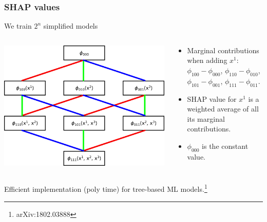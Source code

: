 \documentclass[mathserif, 10pt]{beamer}
\begin{document}
\begin{frame}
    \frametitle{SHAP values}
    We train $2^n$ simplified models

    \begin{columns}
        \begin{column}{0.5\textwidth}
            \includegraphics[width=\columnwidth]{figures/shapgraph.png}
        \end{column}
        \begin{column}{0.5\textwidth}
            \begin{itemize}
                \item Marginal contributions {\color{red} when adding $x^1$}: $\phi_{100}-\phi_{000}$, $\phi_{110}-\phi_{010}$, $\phi_{101}-\phi_{001}$, $\phi_{111} - \phi_{011}$.
                \item SHAP value {\color{red}for $x^1$} is a weighted average of all its marginal contributions.
                \item $\phi_{000}$ is the constant value. 
            \end{itemize}
        \end{column}
    \end{columns}
    
    Efficient implementation (poly time) for tree-based ML models.\footnote[1]{arXiv:1802.03888}

\end{frame}
\end{document}
